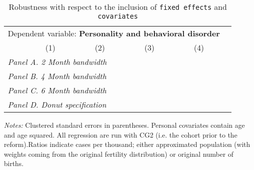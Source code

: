  \begin{table}[H] \begin{threeparttable} \centering \caption{Robustness with respect to the inclusion of \texttt{fixed effects} and \texttt{covariates}} {\def\sym#1{\ifmmode^{#1}\else\(^{#1}\)\fi} \begin{tabular}{l*{5}{c}} \toprule \multicolumn{5}{c}{Dependent variable: \textbf{Personality and behavioral disorder}} \\ \cmidrule(lr){2-5}
            &\multicolumn{1}{c}{(1)}&\multicolumn{1}{c}{(2)}&\multicolumn{1}{c}{(3)}&\multicolumn{1}{c}{(4)}\\
\midrule
 \multicolumn{5}{l}{\emph{Panel A. 2 Month bandwidth}} \\    \midrule\multicolumn{5}{l}{\emph{Panel B. 4 Month bandwidth}} \\    \midrule\multicolumn{5}{l}{\emph{Panel C. 6 Month bandwidth}} \\    \midrule\multicolumn{5}{l}{\emph{Panel D. Donut specification}} \\    \midrule  
\bottomrule \end{tabular} } \begin{tablenotes} \item \scriptsize \emph{Notes:} Clustered standard errors in parentheses. Personal covariates contain age and age squared. All regression are run with CG2 (i.e. the cohort prior to the reform).Ratios indicate cases per thousand; either approximated population (with weights coming from the original fertility distribution) or original number of births. \end{tablenotes} \end{threeparttable} \end{table} 
